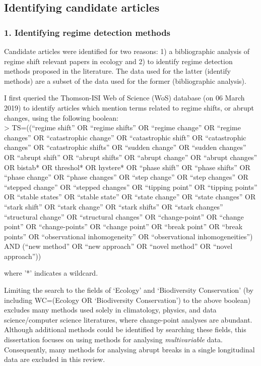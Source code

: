 \documentclass[12pt,twoside,openany]{reedthesis}
\begin{document}
\hypertarget{identifying-candidate-articles}{%
\subsection{Identifying candidate articles}\label{identifying-candidate-articles}}

\hypertarget{identifying-regime-detection-methods}{%
\subsubsection{1. Identifying regime detection methods}\label{identifying-regime-detection-methods}}

Candidate articles were identified for two reasons: 1) a bibliographic analysis of regime shift relevant papers in ecology and 2) to identify regime detection methods proposed in the literature. The data used for the latter (identify methods) are a subset of the data used for the former (bibliographic analysis).

I first queried the Thomson-ISI Web of Science (WoS) database (on 06 March 2019) to identify articles which mention terms related to regime shifts, or abrupt changes, using the following boolean:\\
\textgreater{} TS=((``regime shift'' OR ``regime shifts'' OR ``regime change'' OR ``regime changes'' OR ``catastrophic change'' OR ``catastrophic shift'' OR ``catastrophic changes'' OR ``catastrophic shifts'' OR ``sudden change'' OR ``sudden changes'' OR ``abrupt shift'' OR ``abrupt shifts'' OR ``abrupt change'' OR ``abrupt changes'' OR bistab* OR threshol* OR hystere* OR ``phase shift'' OR ``phase shifts'' OR ``phase change'' OR ``phase changes'' OR ``step change'' OR ``step changes'' OR ``stepped change'' OR ``stepped changes'' OR ``tipping point'' OR ``tipping points'' OR ``stable states'' OR ``stable state'' OR ``state change'' OR ``state changes'' OR ``stark shift'' OR ``stark change'' OR ``stark shifts'' OR ``stark changes'' ``structural change'' OR ``structural changes'' OR ``change-point'' OR ``change point'' OR ``change-points'' OR ``change point'' OR ``break point'' OR ``break points'' OR ``observational inhomogeneity'' OR ``observational inhomogeneities'') AND (``new method'' OR ``new approach'' OR ``novel method'' OR ``novel approach''))

where '*' indicates a wildcard.

Limiting the search to the fields of `Ecology' and `Biodiversity Conservation' (by including WC=(Ecology OR `Biodiversity Conservation') to the above boolean) excludes many methods used solely in climatology, physics, and data science/computer science literatures, where change-point analyses are abundant. Although additional methods could be identified by searching these fields, this dissertation focuses on using methods for analysing \emph{multivariable} data. Consequently, many methods for analysing abrupt breaks in a single longitudinal data are excluded in this review.
\end{document}

